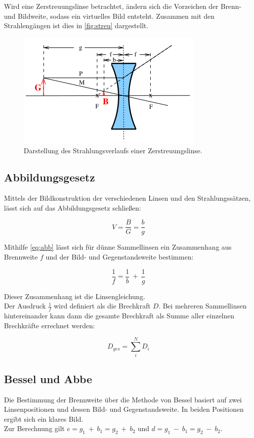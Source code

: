 Wird eine Zerstreuungslinse betrachtet, ändern sich die Vorzeichen der Brenn- und Bildweite, sodass ein virtuelles Bild entsteht.
Zusammen mit den Strahlengängen ist dies in \autoref{fig:streu} dargestellt.

\begin{figure}[htbp]
    \centering
    \includegraphics[scale=0.5]{Data/Streudia.png}
    \caption{Darstellung des Strahlungsverlaufs einer Zerstreuungslinse.}
    \label{fig:streu}
\end{figure}

\subsection{Abbildungsgesetz}
Mittels der Bildkonstruktion der verschiedenen Linsen und den Strahlungssätzen, lässt sich auf das Abbildungsgesetz schließen:

\begin{equation}
    V=\frac{B}{G}=\frac{b}{g}
    \label{eq:abb}
\end{equation}

Mithilfe \autoref{eq:abb} lässt sich für dünne Sammellinsen ein Zusammenhang aus Brennweite $f$ und der Bild- und Gegenstandsweite bestimmen:

\begin{equation}
    \frac{1}{f} = \frac{1}{b}\ +\ \frac{1}{g}
    \label{eq:linse}
\end{equation}

Dieser Zusammenhang ist die Linsengleichung.\\
Der Ausdruck $\frac{1}{f}$ wird definiert als die Brechkraft $D$.
Bei mehreren Sammellinsen hintereinander kann dann die gesamte Brechkraft als Summe aller einzelnen Brechkräfte errechnet werden:

\begin{equation}
    D_{ges} = \sum_i^N D_i
\end{equation}

\subsection{Bessel und Abbe}
Die Bestimmung der Brennweite über die Methode von Bessel basiert auf zwei Linsenpositionen und dessen Bild- und Gegenstandsweite.
In beiden Positionen ergibt sich ein klares Bild.\\
Zur Berechnung gilt $e = g_1\ +\ b_1=g_2\ +\ b_2$ und $d = g_1\ -\ b_1=g_2\ -\ b_2$.

